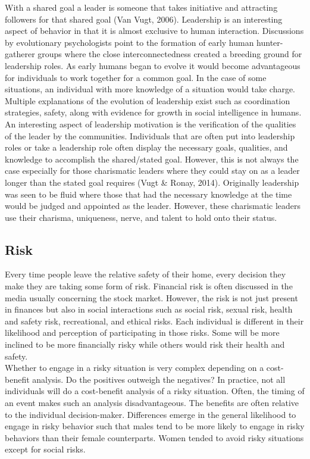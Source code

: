 \documentclass[
  english,
  a4paper,floatsintext]{apa7}
\begin{document}
With a shared goal a leader is someone that takes initiative and attracting followers for that shared goal (Van Vugt, 2006). Leadership is an interesting aspect of behavior in that it is almost exclusive to human interaction. Discussions by evolutionary psychologists point to the formation of early human hunter-gatherer groups where the close interconnectedness created a breeding ground for leadership roles. As early humans began to evolve it would become advantageous for individuals to work together for a common goal. In the case of some situations, an individual with more knowledge of a situation would take charge. Multiple explanations of the evolution of leadership exist such as coordination strategies, safety, along with evidence for growth in social intelligence in humans.\\
An interesting aspect of leadership motivation is the verification of the qualities of the leader by the communities. Individuals that are often put into leadership roles or take a leadership role often display the necessary goals, qualities, and knowledge to accomplish the shared/stated goal. However, this is not always the case especially for those charismatic leaders where they could stay on as a leader longer than the stated goal requires (Vugt \& Ronay, 2014). Originally leadership was seen to be fluid where those that had the necessary knowledge at the time would be judged and appointed as the leader. However, these charismatic leaders use their charisma, uniqueness, nerve, and talent to hold onto their status.

\hypertarget{risk}{%
\subsection{Risk}\label{risk}}

Every time people leave the relative safety of their home, every decision they make they are taking some form of risk. Financial risk is often discussed in the media usually concerning the stock market. However, the risk is not just present in finances but also in social interactions such as social risk, sexual risk, health and safety risk, recreational, and ethical risks. Each individual is different in their likelihood and perception of participating in those risks. Some will be more inclined to be more financially risky while others would risk their health and safety.\\
Whether to engage in a risky situation is very complex depending on a cost-benefit analysis. Do the positives outweigh the negatives? In practice, not all individuals will do a cost-benefit analysis of a risky situation. Often, the timing of an event makes such an analysis disadvantageous. The benefits are often relative to the individual decision-maker. Differences emerge in the general likelihood to engage in risky behavior such that males tend to be more likely to engage in risky behaviors than their female counterparts. Women tended to avoid risky situations except for social risks.
\end{document}
